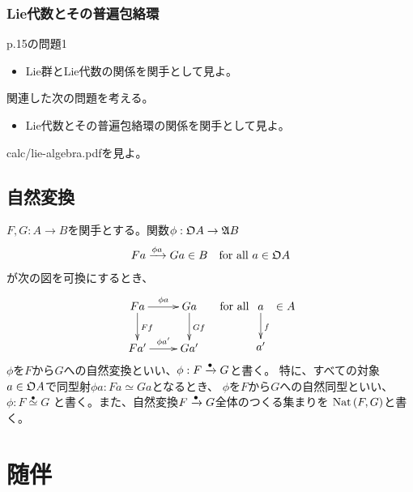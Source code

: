 {\subsubsection{Lie代数とその普遍包絡環}\label{s3:Lie代数とその普遍包絡環} %
	\cite{maclane.work}p.15の問題1
	\begin{itemize}\setlength{\itemsep}{-1mm} %
		\item Lie群とLie代数の関係を関手として見よ。
	\end{itemize} %
	関連した次の問題を考える。
	\begin{itemize}\setlength{\itemsep}{-1mm} %
		\item Lie代数とその普遍包絡環の関係を関手として見よ。
	\end{itemize} %
	calc/lie-algebra.pdfを見よ。
\subsection{自然変換}\label{s2:自然変換} %
	\begin{definition}[自然変換]\label{def:自然変換} %
		$F,G:A\to B$を関手とする。関数$\phi:{\mathfrak{O}} A\to{\mathfrak{A}} B$
		\begin{equation*}\begin{split}
			Fa\xrightarrow[{}]{\phi a} Ga\in B \quad\text{for all } a\in{\mathfrak{O}} A
		\end{split}\end{equation*}
		が次の図を可換にするとき、
		\begin{equation*}\begin{split}
			\xymatrix{
				Fa \ar[r]^{\phi a} \ar[d]^{Ff} & Ga \ar[d]^{Gf} \\
				Fa' \ar[r]^{\phi a'} & Ga' \\
			} \quad\text{for all } \xymatrix{
				a \ar[d]^f \\ a'
			} \in A
		\end{split}\end{equation*}
		$\phi$を$F$から$G$への自然変換といい、$\phi:F\xrightarrow[{}]{\bullet}G$と書く。
		特に、すべての対象$a\in{\mathfrak{O}} A$で同型射$\phi a:Fa\simeq Ga$となるとき、
		$\phi$を$F$から$G$への自然同型といい、$\phi:F\overset{\bullet}{\simeq}G$
		と書く。また、自然変換$F\xrightarrow[{}]{\bullet}G$全体のつくる集まりを
		$\mathinner{\operatorname{Nat}}(F,G)$と書く。\EOP
	\end{definition} %
\section{随伴}\label{s1:随伴} %
}
